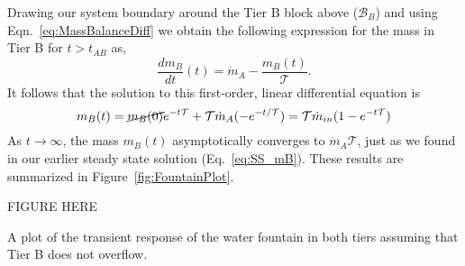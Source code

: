 \documentclass{article}
\begin{document}
Drawing our system boundary around the Tier B block above ($\mathcal{B}_B$) and using Eqn.~\eqref{eq:MassBalanceDiff} we obtain the following expression for the mass in Tier B for $t > t_{AB}$ as,
\begin{equation}
\frac{dm_B}{dt}(t) = \dot{m}_{A} - \frac{m_B(t)}{\mathcal{T}}.
\end{equation}
It follows that the solution to this first-order, linear differential equation is
\begin{equation}
m_B(t)= \cancel{m_B(0)}e^{-t\mathcal{T}} + \mathcal{T}\dot{m}_{A} (-e^{-t/\mathcal{T}})=  \mathcal{T}\dot{m}_{in} (1-e^{-t\mathcal{T}})
\end{equation}
As $t\rightarrow\infty$, the mass $m_B(t)$ asymptotically converges to $\dot{m}_A\mathcal{T}$, just as we found in our earlier steady state solution (Eq.~\eqref{eq:SS_mB}). These results are summarized in Figure~\ref{fig:FountainPlot}. 

\color{red} FIGURE HERE

\caption{A plot of the transient response of the water fountain in both tiers assuming that Tier B does not overflow.}\label{fig:FountainPlot}
\end{document}
